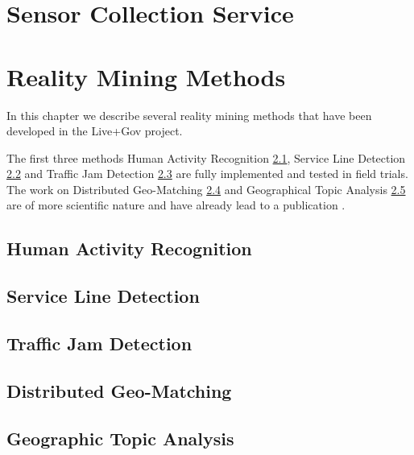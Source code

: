 \documentclass[external]{20120615_deliverable_template_ukob}
\theoremstyle{definition}
\begin{document}
\clearpage
\chapter{Sensor Collection Service}
\label{chap:sc}


\clearpage
\chapter{Reality Mining Methods}

In this chapter we describe several reality mining methods that have
been developed in the Live+Gov project.

The first three methods Human Activity Recognition \ref{sec:HAR},
Service Line Detection \ref{sec:SLD} and Traffic Jam Detection
\ref{sec:TJD} are fully implemented and tested in field trials.
The work on Distributed Geo-Matching \ref{sec:DGM} and Geographical Topic
Analysis \ref{sec:GTA} are of more scientific nature and have already
lead to a publication \cite{CCK1}.

\section{Human Activity Recognition}
\label{sec:HAR}


\clearpage
\section{Service Line Detection}
\label{sec:SLD}


\clearpage
\section{Traffic Jam Detection}
\label{sec:TJD}


\clearpage
\section{Distributed Geo-Matching}
\label{sec:DGM}


\clearpage
\section{Geographic Topic Analysis}
\label{sec:GTA}



\end{document}
